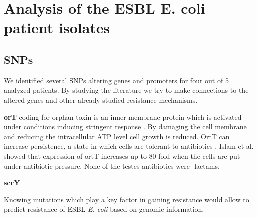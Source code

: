 \section{Analysis of the ESBL E. coli patient isolates}

\subsection{SNPs}

We identified several SNPs 	altering genes and promoters for four out of 5 analyzed patients. By studying the literature we try to make connections to the altered genes and other already studied resistance mechanisms. 

\textbf{orT} coding for orphan toxin is an inner-membrane protein which is activated under conditions inducing stringent response \cite{islam_orphan_2015}. By damaging the cell membrane and reducing the intracellular ATP level cell growth is reduced. OrtT can increase persistence, a state in which cells are tolerant to antibiotics \cite{islam_orphan_2015}. Islam et al. showed that expression of ortT increases up to 80 fold when the cells are put under antibiotic pressure. None of the testes antibiotics were \textbeta-lactams. 

\textbf{scrY}


Knowing mutations which play a key factor in gaining resistance would allow to predict resistance of ESBL \textit{E. coli} based on genomic information. 